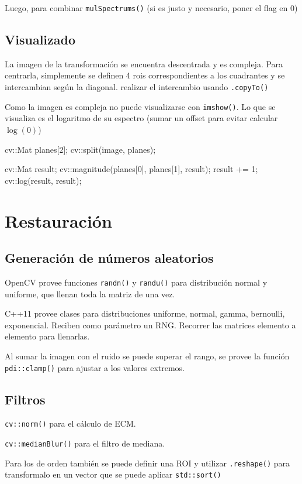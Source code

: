 \documentclass[oneside,a4paper]{book}
\begin{document}
	Luego, para combinar
	\verb|mulSpectrums()|
	(si es justo y necesario, poner el flag en 0)


	\section{Visualizado}
	La imagen de la transformación se encuentra descentrada y es compleja.
	Para centrarla, simplemente se definen 4 rois correspondientes a los cuadrantes y se intercambian según la diagonal.
	realizar el intercambio usando \verb|.copyTo()|

	Como la imagen es compleja no puede visualizarse con \verb|imshow()|. Lo que se visualiza es el logaritmo de su espectro (sumar un offset para evitar calcular $\log(0)$)

	cv::Mat planes[2];
	cv::split(image, planes);

	cv::Mat result;
	cv::magnitude(planes[0], planes[1], result);
	result += 1;
	cv::log(result, result);



	\chapter{Restauración}
		\section{Generación de números aleatorios}
			OpenCV provee funciones \verb|randn()| y \verb|randu()| para distribución normal y uniforme, que llenan toda la matriz de una vez.

			C++11 provee clases para distribuciones uniforme, normal, gamma, bernoulli, exponencial. Reciben como parámetro un RNG.
			Recorrer las matrices elemento a elemento para llenarlas.

			Al sumar la imagen con el ruido se puede superar el rango, se provee la función \verb|pdi::clamp()| para ajustar a los valores extremos.

		\section{Filtros}
			\verb|cv::norm()| para el cálculo de ECM.

			\verb|cv::medianBlur()| para el filtro de mediana.

			Para los de orden también se puede definir una ROI y utilizar \verb|.reshape()| para transformalo en un vector que se puede aplicar \verb|std::sort()|
\end{document}
